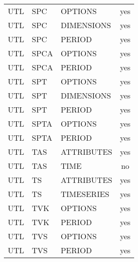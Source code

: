 \begin{longtable}{p{1.5cm} p{1.5cm} p{3cm} c}
\hline
UTL & SPC & OPTIONS & yes \\ 
UTL & SPC & DIMENSIONS & yes \\ 
UTL & SPC & PERIOD & yes \\ 
\hline
UTL & SPCA & OPTIONS & yes \\ 
UTL & SPCA & PERIOD & yes \\ 
\hline
UTL & SPT & OPTIONS & yes \\ 
UTL & SPT & DIMENSIONS & yes \\ 
UTL & SPT & PERIOD & yes \\ 
\hline
UTL & SPTA & OPTIONS & yes \\ 
UTL & SPTA & PERIOD & yes \\ 
\hline
UTL & TAS & ATTRIBUTES & yes \\ 
UTL & TAS & TIME & no \\ 
\hline
UTL & TS & ATTRIBUTES & yes \\ 
UTL & TS & TIMESERIES & yes \\ 
\hline
UTL & TVK & OPTIONS & yes \\ 
UTL & TVK & PERIOD & yes \\ 
\hline
UTL & TVS & OPTIONS & yes \\ 
UTL & TVS & PERIOD & yes \\ 


\hline
\end{longtable}
\label{table:blocks}
\normalsize
